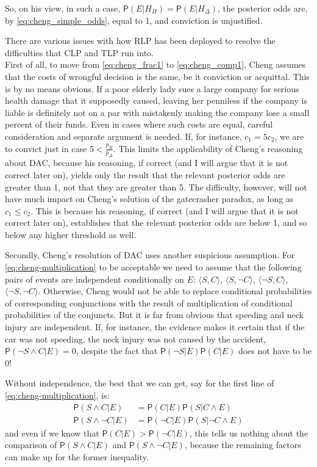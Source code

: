 \documentclass[10pt,dvipsnames,enabledeprecatedfontcommands]{scrartcl}
\newcommand{\ra}{\rangle}
\newcommand{\la}{\langle}
\newcommand{\n}{\neg}
\newcommand{\et}{\wedge}
\newcommand{\pr}[1]{\mathsf{P}(#1)}
\begin{document}
\noindent So, on his view, in such a case,
\(\pr{E\vert H_\Pi}=\pr{E\vert H_\Delta}\), the posterior odds are, by
\eqref{eq:cheng_simple_odds}, equal to 1, and conviction is unjustified.

There are various issues with how RLP has been deployed to resolve the
difficulties that CLP and TLP run into.\\
First of all, to move from \eqref{eq:cheng_frac1} to
\eqref{eq:cheng_comp1}, Cheng assumes that the costs of wrongful
decision is the same, be it conviction or acquittal. This is by no means
obvious. If a poor elderly lady sues a large company for serious health
damage that it supposedly caused, leaving her penniless if the company
is liable is definitely not on a par with mistakenly making the company
lose a small percent of their funds. Even in cases where such costs are
equal, careful consideration and separate argument is needed. If, for
instance, \(c_1=5c_2\), we are to convict just in case
\(5<\frac{p_\Pi}{p_\Delta}\). This limits the applicability of Cheng's
reasoning about DAC, because his reasoning, if correct (and I will argue
that it is not correct later on), yields only the result that the
relevant posterior odds are greater than 1, not that they are greater
than 5. The difficulty, however, will not have much impact on Cheng's
solution of the gatecrasher paradox, as long as \(c_1\leq c_2\). This is
because his reasoning, if correct (and I will argue that it is not
correct later on), establishes that the relevant posterior odds are
below 1, and so below any higher threshold as well.

Secondly, Cheng's resolution of DAC uses another suspicious assumption.
For \eqref{eq:cheng-multiplication} to be acceptable we need to assume
that the following pairs of events are independent conditionally on
\(E\): \(\la S, C\ra\), \(\la S, \n C\ra\), \(\la \n S, C\ra\),
\(\la \n S, \n C\ra\). Otherwise, Cheng would not be able to replace
conditional probabilities of corresponding conjunctions with the result
of multiplication of conditional probabilities of the conjuncts. But it
is far from obvious that speeding and neck injury are independent. If,
for instance, the evidence makes it certain that if the car was not
speeding, the neck injury was not caused by the accident,
\(\pr{\n S\et C\vert E}=0\), despite the fact that
\(\pr{\n S \vert E}\pr{C\vert E}\) does not have to be \(0\)!

Without independence, the best that we can get, say for the first line
of \eqref{eq:cheng-multiplication}, is: \begin{align*}
\pr{S\et C\vert E} & = \pr{C\vert E}\pr{S\vert C \et E}\\
\pr{S\et \n C\vert E} & = \pr{\n C\vert E}\pr{S\vert  \n C \et E}
\end{align*} and even if we know that
\(\pr{C\vert E}>\pr{\n C\vert E}\), this tells us nothing about the
comparison of \(\pr{S\et C\vert E}\) and \(\pr{S\et \n C\vert E}\),
because the remaining factors can make up for the former inequality.
\end{document}
